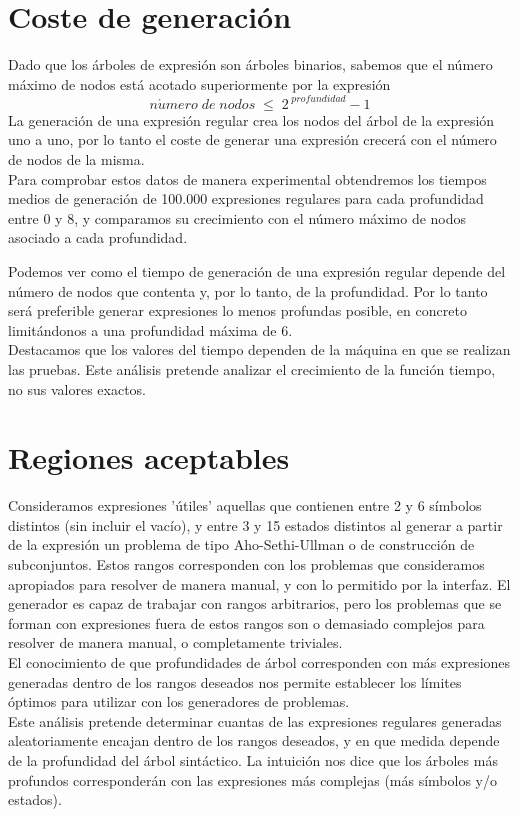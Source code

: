 \section{Coste de generación}

Dado que los árboles de expresión son árboles binarios, sabemos que el número máximo de nodos está acotado superiormente por la expresión
\[
n\acute{u}mero \; de \; nodos \; \leq \; 2^{\;profundidad} - 1
\]
La generación de una expresión regular crea los nodos del árbol de la expresión uno a uno, por lo tanto el coste de generar una expresión crecerá con el número de nodos de la misma.
\\
Para comprobar estos datos de manera experimental obtendremos los tiempos medios de generación de 100.000 expresiones regulares para cada profundidad entre 0 y 8, y comparamos su crecimiento con el número máximo de nodos asociado a cada profundidad.


Podemos ver como el tiempo de generación de una expresión regular depende del número de nodos que contenta y, por lo tanto, de la profundidad.
Por lo tanto será preferible generar expresiones lo menos profundas posible, en concreto limitándonos a una profundidad máxima de 6.
\\
Destacamos que los valores del tiempo dependen de la máquina en que se realizan las pruebas.
Este análisis pretende analizar el crecimiento de la función tiempo, no sus valores exactos.

\section{Regiones aceptables}

Consideramos expresiones 'útiles' aquellas que contienen entre 2 y 6 símbolos distintos (sin incluir el vacío), y entre 3 y 15 estados distintos al generar a partir de la expresión un problema de tipo Aho-Sethi-Ullman o de construcción de subconjuntos.
Estos rangos corresponden con los problemas que consideramos apropiados para resolver de manera manual, y con lo permitido por la interfaz.
El generador es capaz de trabajar con rangos arbitrarios, pero los problemas que se forman con expresiones fuera de estos rangos son o demasiado complejos para resolver de manera manual, o completamente triviales.
\\
El conocimiento de que profundidades de árbol corresponden con más expresiones generadas dentro de los rangos deseados nos permite establecer los límites óptimos para utilizar con los generadores de problemas.
\\
Este análisis pretende determinar cuantas de las expresiones regulares generadas aleatoriamente encajan dentro de los rangos deseados, y en que medida depende de la profundidad del árbol sintáctico.
La intuición nos dice que los árboles más profundos corresponderán con las expresiones más complejas (más símbolos y/o estados).

